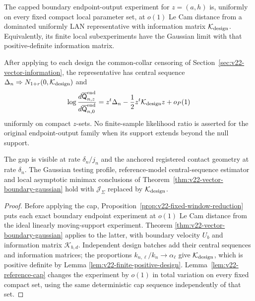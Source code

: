 \begin{theorem}
\label{thm:v22-fixed-window-gaussian}
The capped boundary endpoint-output experiment for $z=(a,h)$ is, uniformly on
every fixed compact local parameter set, at $o(1)$ Le Cam distance from a
dominated uniformly LAN representative with information matrix
$\mathcal K_{\rm design}$.  Equivalently, its finite local subexperiments have
the Gaussian limit with that positive-definite information matrix.

After applying to each design the common-collar censoring of
Section~\ref{sec:v22-vector-information}, the representative has central
sequence $\Delta_n\Rightarrow
N_{1+r}(0,\mathcal K_{\rm design})$ and
\begin{equation}\label{eq:v22-physical-lan-representative}
 \log\frac{d\overline{\mathsf Q}_{n,z}^{\rm end}}
          {d\overline{\mathsf Q}_{n,0}^{\rm end}}
 =z^t\Delta_n-\frac12z^t\mathcal K_{\rm design}z+o_P(1)
\end{equation}
uniformly on compact $z$-sets.  No finite-sample likelihood ratio is asserted
for the original endpoint-output family when its support extends beyond the
null support.

The gap is visible at rate $\delta_n/j_n$ and the anchored registered contact
geometry at rate $\delta_n$.  The Gaussian testing profile, reference-model
central-sequence estimator and local asymptotic minimax conclusions of
Theorem~\ref{thm:v22-vector-boundary-gaussian} hold with
$\mathcal J_\Sigma$ replaced by $\mathcal K_{\rm design}$.
\end{theorem}

\begin{proof}
Before applying the cap, Proposition~\ref{prop:v22-fixed-window-reduction}
puts each exact boundary endpoint experiment at $o(1)$ Le Cam distance from
the ideal linearly moving-support experiment.  Theorem
\ref{thm:v22-vector-boundary-gaussian} applies to the latter, with boundary
velocity $U_b$ and information matrix $\mathcal K_{b,d}$.  Independent design
batches add their central sequences and information matrices; the proportions
$k_{n,\ell}/k_n\to\alpha_\ell$ give
$\mathcal K_{\rm design}$, which is positive definite by Lemma
\ref{lem:v22-finite-positive-design}.  Lemma~\ref{lem:v22-reference-cap}
changes the experiment by $o(1)$ in total variation on every fixed compact
set, using the same deterministic cap sequence independently of that set.
\end{proof}

